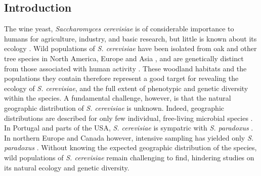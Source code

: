 \documentclass[12pt]{article}
\begin{document}
\begin{linenumbers}
\section*{Introduction}
\label{sec:Introduction}
\doublespacing

The wine yeast, \textit{Saccharomyces cerevisiae} is of considerable importance to humans for agriculture, industry, and basic research, but little is known about its ecology \citep{goddard_saccharomyces_2015,liti_fascinating_2015}. Wild populations of \textit{S. cerevisiae} have been isolated from oak and other tree species in North America, Europe and Asia \citep{sniegowski_saccharomyces_2002,sampaio_natural_2008,diezmann_saccharomyces_2009,wang_surprisingly_2012,hyma_mixing_2013}, and are genetically distinct from those associated with human activity \citep{fay_evidence_2005,cromie_genomic_2013,almeida_population_2015}. These woodland habitats and the populations they contain therefore represent a good target for revealing the ecology of \textit{S. cerevisiae}, and the full extent of phenotypic and genetic diversity within the species. A fundamental challenge, however, is that the natural geographic distribution of \textit{S. cerevisiae} is unknown. Indeed, geographic distributions are described for only few individual, free-living microbial species \citep{taylor_eukaryotic_2006,green_spatial_2006,martiny_microbial_2006}. In Portugal and parts of the USA, \textit{S. cerevisiae} is sympatric with \textit{S. paradoxus} \citep{sniegowski_saccharomyces_2002,sampaio_natural_2008,hyma_mixing_2013}. In northern Europe and Canada however, intensive sampling has yielded only \textit{S. paradoxus} \citep{johnson_population_2004,charron_exploring_2014,kowallik_interaction_2015,sylvester_temperature_2015,leducq_speciation_2015}. Without knowing the expected geographic distribution of the species, wild populations of \textit{S. cerevisiae} remain challenging to find, hindering studies on its natural ecology and genetic diversity. 


\end{linenumbers}
\end{document}
